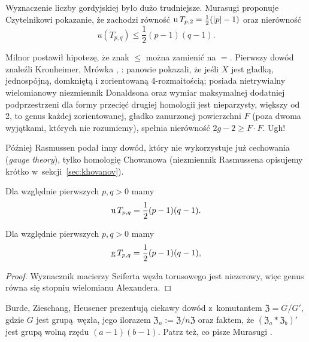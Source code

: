 Wyznaczenie liczby gordyjskiej było dużo trudniejsze.
Murasugi \cite[s. 150]{murasugi1996} proponuje Czytelnikowi pokazanie, że zachodzi równość $\operatorname{u} T_{p, 2} = \frac 12 (|p| - 1)$ oraz nierówność
\begin{equation}
    u(T_{p, q}) \le \frac 12 (p-1)(q-1).
\end{equation}

Milnor \cite[uwaga 10.9]{milnor1968} postawił hipotezę, że znak $\le$ można zamienić na $=$.
%
Pierwszy dowód znaleźli Kronheimer, Mrówka \cite{kronheimer1993}, \cite{kronheimer1995}: panowie pokazali, że jeśli $X$ jest gładką, jednospójną, domkniętą i zorientowaną 4-rozmaitością; posiada nietrywialny wielomianowy niezmiennik Donaldsona oraz wymiar maksymalnej dodatniej podprzestrzeni dla formy przecięć drugiej homologii jest nieparzysty, większy od 2, to genus każdej zorientowanej, gładko zanurzonej powierzchni $F$ (poza dwoma wyjątkami, których nie rozumiemy), spełnia nierówność $2g - 2 \ge F \cdot F$.
Ugh!

Później Rasmussen \cite{rasmussen2010} podał inny dowód, który nie wykorzystuje już cechowania (\emph{gauge theory}), tylko homologię Chowanowa (niezmiennik Rasmussena opisujemy krótko w~sekcji~\ref{sec:khovanov}).
%

\begin{proposition}
%
\label{prp:torus_unknotting_number}%
    Dla względnie pierwszych $p, q > 0$ mamy
    \begin{equation}
        \operatorname{u} T_{p, q} = \frac 12 (p - 1)(q - 1).
    \end{equation}
\end{proposition}

\begin{proposition}
    Dla względnie pierwszych $p, q > 0$ mamy
    \begin{equation}
        \operatorname{g} T_{p, q} = \frac 12 (p - 1)(q - 1),
    \end{equation}
\end{proposition}

\begin{proof}
    Wyznacznik macierzy Seiferta węzła torusowego jest niezerowy, więc genus równa się stopniu wielomianu Alexandera.
\end{proof}

Burde, Zieschang, Heusener \cite[s. 63]{burde2014} prezentują ciekawy dowód z~komutantem $\mathfrak{Z} = G/G'$, gdzie $G$ jest grupą węzła, jego ilorazem $\mathfrak{Z}_n := \mathfrak{Z} / n\mathfrak {Z}$ oraz faktem, że $(\mathfrak{Z}_a * \mathfrak{Z}_b)'$ jest grupą wolną rzędu $(a-1)(b-1)$.
Patrz też, co pisze Murasugi \cite[s. 149]{murasugi1996}.


